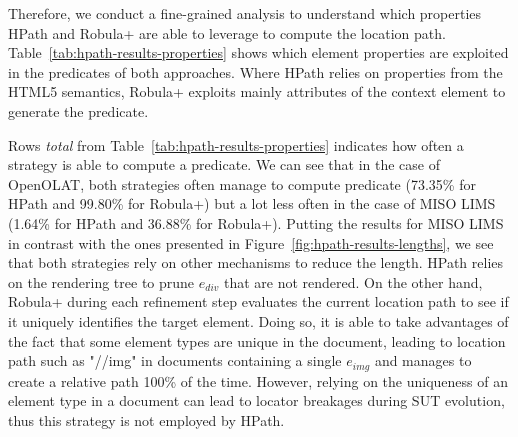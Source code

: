 Therefore, we conduct a fine-grained analysis to understand which properties HPath and Robula+ are able to leverage to compute the location path. Table~\ref{tab:hpath-results-properties} shows which element properties are exploited in the predicates of both approaches. Where HPath relies on properties from the HTML5 semantics, Robula+ exploits mainly attributes of the context element to generate the predicate.

Rows \emph{total} from Table~\ref{tab:hpath-results-properties} indicates how often a strategy is able to compute a predicate. We can see that in the case of OpenOLAT, both strategies often manage to compute predicate (73.35\% for HPath and 99.80\% for Robula+) but a lot less often in the case of MISO LIMS (1.64\% for HPath and 36.88\% for Robula+). Putting the results for MISO LIMS in contrast with the ones presented in Figure~\ref{fig:hpath-results-lengths}, we see that both strategies rely on other mechanisms to reduce the length. HPath relies on the rendering tree to prune $e_{div}$ that are not rendered. On the other hand, Robula+ during each refinement step evaluates the current location path to see if it uniquely identifies the target element. Doing so, it is able to take advantages of the fact that some element types are unique in the document, leading to location path such as "//img" in documents containing a single $e_{img}$ and manages to create a relative path 100\% of the time. However, relying on the uniqueness of an element type in a document can lead to locator breakages during SUT evolution, thus this strategy is not employed by HPath.


